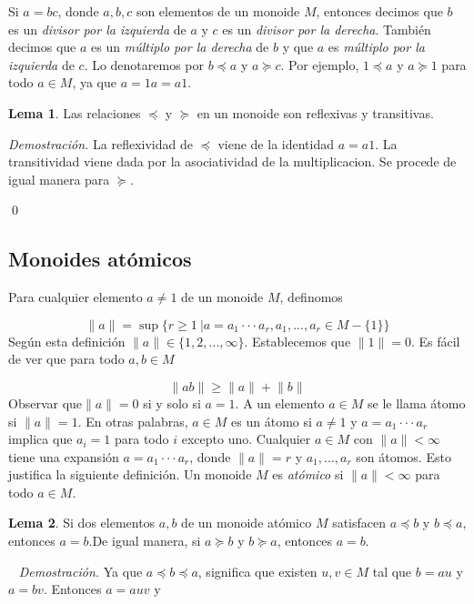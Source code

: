 \documentclass[12pt]{article}
\theoremstyle{definition}
\newtheorem{lema}{Lema}[section]
\providecommand{\norm}[1]{\lVert#1\rVert}
\begin{document}
Si $a=bc$, donde $a,b,c$ son elementos de un monoide $M$, entonces decimos que $b$ es un \textit{divisor por la izquierda} de $a$ y $c$ es un \textit{divisor por la derecha}. También decimos que $a$ es un \textit{múltiplo por la derecha} de $b$ y que $a$ es \textit{múltiplo por la izquierda} de $c$. Lo denotaremos por $b\preceq a$ y $a\succeq c$. Por ejemplo, $1\preceq a$ y $a\succeq 1$ para todo $a\in M$, ya que $a=1a=a1$.

\begin{lema}
Las relaciones $\preceq$ y $\succeq$ en un monoide son reflexivas y transitivas.
\label{lema:rel1}
\end{lema}

\textit{Demostración.} La reflexividad de $\preceq$ viene de la identidad $a=a1$. La transitividad viene dada por la asociatividad de la multiplicacion. Se procede de igual manera para $\succeq$.

\qed


\subsection{Monoides atómicos}

Para cualquier elemento $a\neq 1$ de un monoide $M$, definomos

$$\norm{a}=\sup\{r\geq 1\ | a=a_1\cdot\cdot\cdot a_r,a_1,...,a_r\in M-\{1\}\}$$
\newline
Según esta definición $\norm{a}\in\{1,2,...,\infty\}$. Establecemos que $\norm{1}=0$. Es fácil de ver que para todo $a,b\in M$

$$\norm{ab}\geq\norm{a}+\norm{b}$$
\newline
Observar que$\norm{a}=0$ si y solo si $a=1$. A un elemento $a\in M$ se le llama átomo si $\norm{a}=1$. En otras palabras, $a\in M$ es un átomo si $a\neq 1$ y $a=a_1\cdot\cdot\cdot a_r$ implica que $a_i=1$ para todo $i$ excepto uno. Cualquier $a\in M$ con $\norm{a} < \infty$ tiene una expansión $a=a_1\cdot\cdot\cdot a_r$, donde $\norm{a}=r$ y $a_1,...,a_r$ son átomos. Esto justifica la siguiente definición. Un monoide $M$ es \textit{atómico} si $\norm{a} < \infty$ para todo $a\in M$.

\begin{lema}
Si dos elementos $a,b$ de un monoide atómico $M$ satisfacen $a\preceq b$ y $b\preceq a$, entonces $a=b$.De igual manera, si $a\succeq b$ y $b\succeq a$, entonces $a=b$.
\label{lema:rel2}
\end{lema}
\ 
\newline
\textit{Demostración.} Ya que $a\preceq b\preceq a$, significa que existen $u,v\in M$ tal que $b=au$ y $a=bv$. Entonces $a=auv$ y
\end{document}
